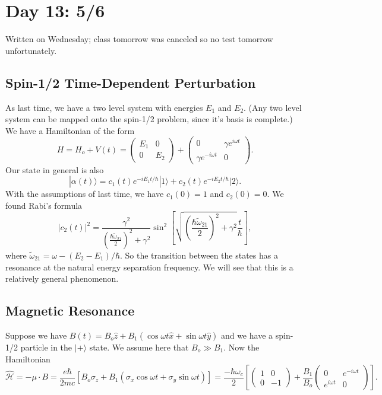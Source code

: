 \documentclass[fontsize=12pt]{scrartcl}
\newcommand{\ra}{\rangle}
\newcommand{\Ham}{\hat{\mathcal{H}}}
\begin{document}
\section{Day 13: 5/6}

Written on Wednesday; class tomorrow was canceled so no test tomorrow unfortunately.

\subsection{Spin-1/2 Time-Dependent Perturbation}

As last time, we have a two level system with energies $E_1$ and $E_2$. (Any two level system can be mapped onto the spin-1/2 problem, since it's basis is complete.) We have a Hamiltonian of the form $$ H=H_o+V(t)=\left(\begin{matrix}
E_1 & 0 \\ 0 & E_2
\end{matrix}\right)+\left(\begin{matrix}
0 & \gamma e^{i\omega t} \\ \gamma e^{-i\omega t} & 0
\end{matrix}\right).$$ Our state in general is also $$|\alpha(t)\ra = c_1(t)e^{-iE_1t/\hbar}|1\ra+c_2(t)e^{-iE_2t/\hbar}|2\ra.$$ With the assumptions of last time, we have $c_1(0)=1$ and $c_2(0)=0$. We found Rabi's formula $$|c_2(t)|^2 = \frac{\gamma^2}{\left(\frac{\hbar\tilde{\omega}_{21}}{2}\right)^2+\gamma^2}\sin^2\left[\sqrt{\left(\frac{\hbar\tilde{\omega}_{21}}{2}\right)^2+\gamma^2}\frac{t}{\hbar}\right],$$ where $\tilde{\omega}_{21}=\omega - (E_2-E_1)/\hbar$. So the transition between the states has a resonance at the natural energy separation frequency. We will see that this is a relatively general phenomenon.

\subsection{Magnetic Resonance}

Suppose we have $B(t)=B_o\hat{z}+B_1(\cos\omega t \hat{x}+\sin\omega t \hat{y})$ and we have a spin-1/2 particle in the $|+\ra$ state. We assume here that $B_o\gg B_1$. Now the Hamiltonian $$\Ham=-\mu\cdot B=\frac{e\hbar}{2mc}\left[B_o\sigma_z+B_1(\sigma_x\cos\omega t+\sigma_y\sin\omega t)\right]=\frac{-\hbar\omega_c}{2}\left[\left(\begin{matrix}
1&0\\0&-1
\end{matrix}\right)+\frac{B_1}{B_o}\left(\begin{matrix}
0&e^{-i\omega t}\\e^{i\omega t}&0
\end{matrix}\right)\right].$$
\end{document}
